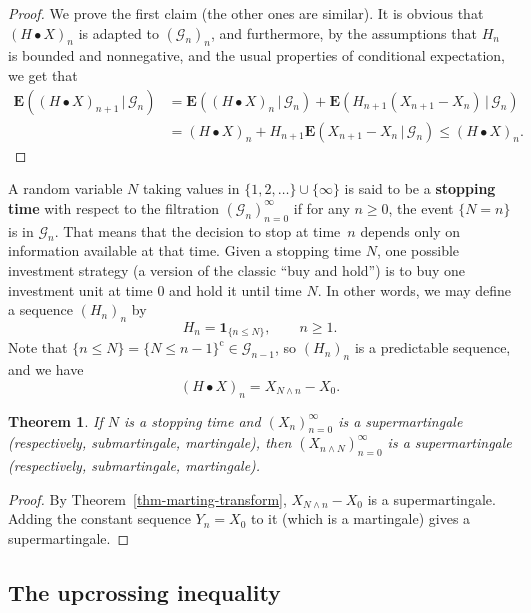 \documentclass[12pt]{article}
\newtheorem{thm}{Theorem}[section]
\newcommand{\expec}{\mathbf{E}}
\newcommand{\condexp}[2]{\expec\left(#1\,|\,#2\right)}
\newcommand{\ind}{\textbf{1}}
\theoremstyle{example}
\begin{document}
\begin{proof} We prove the first claim (the other ones are similar). It is obvious that $(H\bullet X)_n$ is adapted to $(\mathcal{G}_n)_n$, and furthermore, by the assumptions that $H_n$ is bounded and nonnegative, and the usual properties of conditional expectation, we get that
\begin{align*}
\condexp{(H\bullet X)_{n+1}}{\mathcal{G}_n} &= 
\condexp{(H\bullet X)_{n}}{\mathcal{G}_n} + 
\condexp{H_{n+1}(X_{n+1}-X_n)}{\mathcal{G}_n}
\\ &= (H\bullet X)_n +
H_{n+1} \condexp{X_{n+1}-X_n}{\mathcal{G}_n} \le (H\bullet X)_n.
\end{align*}
\end{proof}

A random variable $N$ taking values in $\{1,2,\ldots\}\cup \{\infty\}$ is said to be a \textbf{stopping time} with respect to the filtration $(\mathcal{G}_n)_{n=0}^\infty$ if for any $n\ge0$, the event $\{ N=n \}$ is in $\mathcal{G}_n$. That means that the decision to stop at time~$n$ depends only on information available at that time. Given a stopping time $N$, one possible investment strategy (a version of the classic ``buy and hold'') is to buy one investment unit at time $0$ and hold it until time $N$. In other words, we may define a sequence $(H_n)_n$ by
$$ H_n = \ind_{\{n\le N\}}, \qquad n\ge 1. $$
Note that $\{ n\le N\} = \{N\le n-1\}^\textrm{c} \in \mathcal{G}_{n-1}$, so $(H_n)_n$ is a predictable sequence, and we have
$$ (H\bullet X)_n = X_{N\wedge n} - X_0. $$

\begin{thm} \label{thm-stopping-mart}
If $N$ is a stopping time and $(X_n)_{n=0}^\infty$ is a supermartingale (respectively, submartingale, martingale), then $(X_{n\wedge N})_{n=0}^\infty$ is a supermartingale (respectively, submartingale, martingale).
\end{thm}

\begin{proof}
By Theorem~\ref{thm-marting-transform}, $X_{N\wedge n} - X_0$ is a supermartingale. Adding the constant sequence $Y_n=X_0$ to it (which is a martingale) gives a supermartingale.
\end{proof}

\subsection{The upcrossing inequality}
\end{document}

